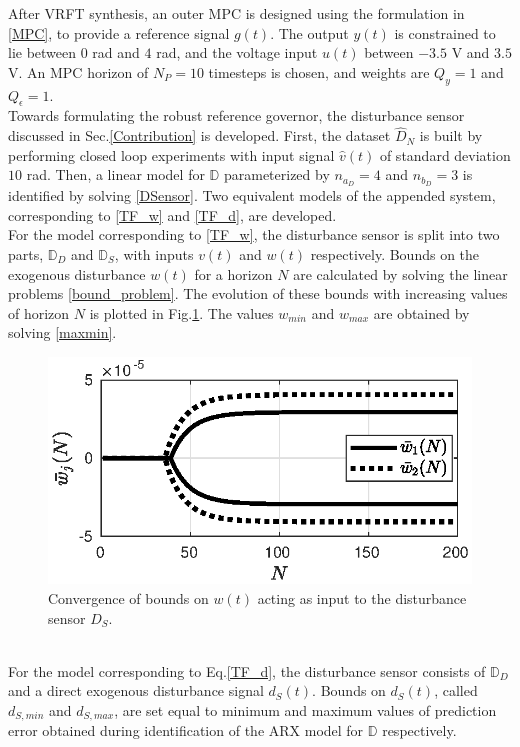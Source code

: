 \documentclass[letterpaper, 10 pt, conference]{ieeeconf}  %
\begin{document}
	After VRFT synthesis, an outer MPC is designed using the formulation in \eqref{MPC}, to provide a reference signal $g(t)$. The output $y(t)$ is constrained to lie between $0$ rad and $4$ rad, and the voltage input $u(t)$ between $-3.5$ V and $3.5$ V. An MPC horizon of $N_P=10$ timesteps is chosen, and weights are $Q_y=1$ and $Q_{\epsilon}=1$. \\
	Towards formulating the robust reference governor, the disturbance sensor discussed in Sec.\ref{Contribution} is developed. First, the dataset $\hat{D}_N$ is built by performing closed loop experiments with input signal $\hat{v}(t)$ of standard deviation $10$ rad. Then, a linear model for $\mathbb{D}$ parameterized by $n_{a_D} = 4$ and $n_{b_D} = 3$ is identified by solving \eqref{DSensor}. Two equivalent models of the appended system, corresponding to \eqref{TF_w} and \eqref{TF_d}, are developed.  \\ 
	\indent For the model corresponding to \eqref{TF_w}, the disturbance sensor is split into two parts, $\mathbb{D}_D$ and $\mathbb{D}_S$, with inputs $v(t)$ and $w(t)$ respectively. Bounds on the exogenous disturbance $w(t)$ for a horizon $N$ are calculated by solving the linear problems \eqref{bound_problem}. The evolution of these bounds with increasing values of horizon $N$ is plotted in Fig.\ref{bounds_RG}.  The values $w_{min}$ and $w_{max}$ are obtained by solving \eqref{maxmin}.
	\begin{figure}[h]
		\hspace{30pt}
		\includegraphics[scale = 0.6]{bounds_RG.eps}
		\caption{Convergence of bounds on $w(t)$ acting as input to the disturbance sensor $D_S$.}
		\label{bounds_RG}
	\end{figure} \\
	For the model corresponding to Eq.\eqref{TF_d}, the disturbance sensor consists of $\mathbb{D}_D$ and a direct exogenous disturbance signal $d_S(t)$. Bounds on $d_S(t)$, called $d_{S,min}$ and $d_{S,max}$, are set equal to minimum and maximum values of prediction error obtained during identification of the ARX model for $\mathbb{D}$ respectively. \vspace{5pt} \\
\end{document}
